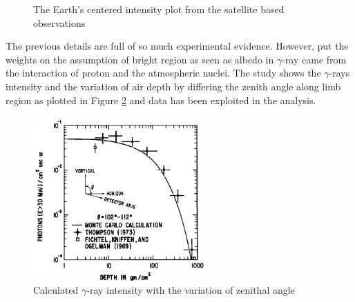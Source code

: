 \begin{figure}[h!]
    \centering
        \hfill
        \caption{
            The Earth's centered intensity plot from the satellite based observations
        }
       \label{fig:gamma_earth_second_wave}
\end{figure}

The previous details are full of so much experimental evidence.
However, \cite{Morris84} put the weights on the assumption of 
bright region as seen as albedo in $\gamma$-ray came from the 
interaction of proton and the atmospheric nuclei. The study
shows the $\gamma$-rays intensity and the variation of air depth 
by differing the zenith angle along limb region as plotted in 
Figure \ref{fig:emit_photon_vs_depth} and \cite{Thompson81} data 
has been exploited in the analysis.

\begin{figure}[h!]
    \centering
    \includegraphics[width=0.6\textwidth]{content/literature_review/figures/morris_photon_vs_depth}
    \caption{
        Calculated $\gamma$-ray intensity with the variation of 
        zenithal angle \citep{Morris84}
    }
    \label{fig:emit_photon_vs_depth}
\end{figure}

